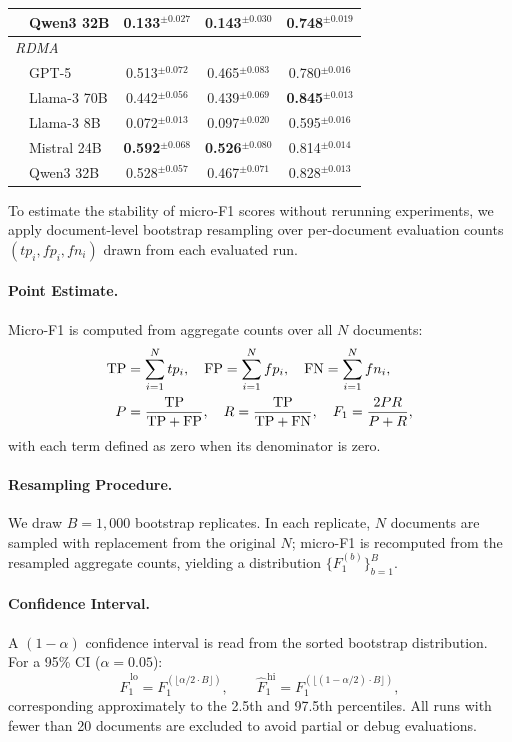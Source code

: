 \begin{table}[t]
\begin{tabular}{llccc}
& Qwen3 32B & 0.133$^{\pm0.027}$ & 0.143$^{\pm0.030}$ & 0.748$^{\pm0.019}$ \\
\midrule
\multicolumn{5}{l}{\textit{RDMA}} \\
& GPT-5 & 0.513$^{\pm0.072}$ & 0.465$^{\pm0.083}$ & 0.780$^{\pm0.016}$ \\
& Llama-3 70B & 0.442$^{\pm0.056}$ & 0.439$^{\pm0.069}$ & \textbf{0.845}$^{\pm0.013}$ \\
& Llama-3 8B & 0.072$^{\pm0.013}$ & 0.097$^{\pm0.020}$ & 0.595$^{\pm0.016}$ \\
& Mistral 24B & \textbf{0.592}$^{\pm0.068}$ & \textbf{0.526}$^{\pm0.080}$ & 0.814$^{\pm0.014}$ \\
& Qwen3 32B & 0.528$^{\pm0.057}$ & 0.467$^{\pm0.071}$ & 0.828$^{\pm0.013}$ \\
\bottomrule
\end{tabular}
\end{table}

To estimate the stability of micro-F1 scores without rerunning experiments,
we apply document-level bootstrap resampling over per-document evaluation
counts $(tp_i, fp_i, fn_i)$ drawn from each evaluated run.

\paragraph{Point Estimate.}
Micro-F1 is computed from aggregate counts over all $N$ documents:
\begin{align}
    \mathrm{TP} &= \sum_{i=1}^{N} tp_i, \quad
    \mathrm{FP} = \sum_{i=1}^{N} fp_i, \quad
    \mathrm{FN} = \sum_{i=1}^{N} fn_i, \notag \\
    P &= \frac{\mathrm{TP}}{\mathrm{TP} + \mathrm{FP}}, \quad
    R  = \frac{\mathrm{TP}}{\mathrm{TP} + \mathrm{FN}}, \quad
    F_1 = \frac{2PR}{P + R},
\end{align}
with each term defined as zero when its denominator is zero.

\paragraph{Resampling Procedure.}
We draw $B = 1{,}000$ bootstrap replicates. In each replicate, $N$ documents
are sampled with replacement from the original $N$; micro-F1 is recomputed
from the resampled aggregate counts, yielding a distribution
$\{F_1^{(b)}\}_{b=1}^{B}$.

\paragraph{Confidence Interval.}
A $(1-\alpha)$ confidence interval is read from the sorted bootstrap
distribution. For a 95\% CI ($\alpha = 0.05$):
\begin{equation}
    \hat{F}_1^{\,\mathrm{lo}} = F_1^{(\lfloor \alpha/2 \cdot B \rfloor)},
    \qquad
    \hat{F}_1^{\,\mathrm{hi}} = F_1^{(\lfloor (1-\alpha/2) \cdot B \rfloor)},
\end{equation}
corresponding approximately to the 2.5th and 97.5th percentiles.
All runs with fewer than 20 documents are excluded to avoid partial or
debug evaluations.

